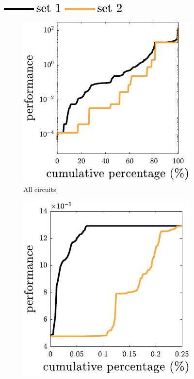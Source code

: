 \begin{figure}[t]
\centering
\includegraphics[width=0.2\columnwidth]{../ch6/figures/template1_lib5_CR_RESULTS_Legend_FINAL.pdf}

\vspace{0.05in}

\begin{subfigure}[b]{0.3\columnwidth}
\centering
\includegraphics[width=\textwidth]{../ch6/figures/template1_lib5_CR_RESULTS}
\caption{All circuits.}
\end{subfigure}%
\begin{subfigure}[b]{0.3\columnwidth}
\centering
\includegraphics[width=\textwidth]{../ch6/figures/template1_lib5_CR_RESULTS_2}

\end{subfigure}
\end{figure}
